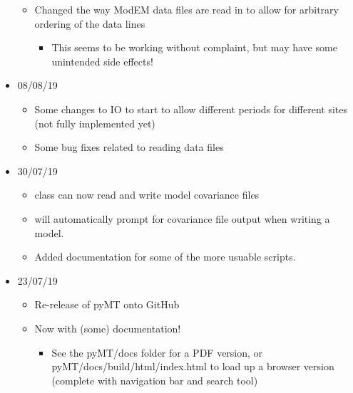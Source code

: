 \documentclass[letterpaper,10pt,english]{sphinxmanual}
\begin{document}
\begin{itemize}
\begin{itemize}
\begin{itemize}
\end{itemize}

\item {} 
Changed the way ModEM data files are read in to allow for arbitrary ordering of the data lines
\begin{itemize}
\item {} 
This seems to be working without complaint, but may have some unintended side effects!

\end{itemize}

\end{itemize}

\item {} 
08/08/19
\begin{itemize}
\item {} 
Some changes to IO to start to allow different periods for different sites (not fully implemented yet)

\item {} 
Some bug fixes related to reading data files

\end{itemize}

\item {} 
30/07/19
\begin{itemize}
\item {} 
{\hyperref[\detokenize{content/api_core/data_structures:model}]{}} class can now read and write model covariance files

\item {} 
{\hyperref[\detokenize{content/mesh_designer/main_window:mesh-designer}]{}} will automatically prompt for covariance file output when writing a model.

\item {} 
Added documentation for some of the more usuable scripts.

\end{itemize}

\item {} 
23/07/19
\begin{itemize}
\item {} 
Re-release of pyMT onto GitHub

\item {} 
Now with (some) documentation!
\begin{itemize}
\item {} 
See the pyMT/docs folder for a PDF version, or pyMT/docs/build/html/index.html to load up a browser version (complete with navigation bar and search tool)

\end{itemize}

\end{itemize}

\end{itemize}
\end{document}
